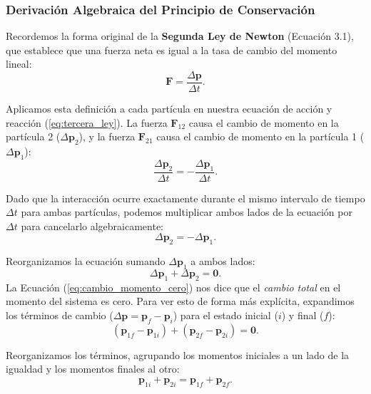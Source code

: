 \documentclass[11pt,a4paper]{book}
\begin{document}
\subsubsection{Derivación Algebraica del Principio de Conservación}

Recordemos la forma original de la \textbf{Segunda Ley de Newton} (Ecuación 3.1), que establece que una fuerza neta es igual a la tasa de cambio del momento lineal:
\begin{equation}
    \boldsymbol{F} = \frac{\Delta \boldsymbol{p}}{\Delta t}.
\end{equation}

Aplicamos esta definición a cada partícula en nuestra ecuación de acción y reacción (\ref{eq:tercera_ley}). La fuerza $\boldsymbol{F}_{12}$ causa el cambio de momento en la partícula 2 ($\Delta \boldsymbol{p}_2$), y la fuerza $\boldsymbol{F}_{21}$ causa el cambio de momento en la partícula 1 ($\Delta \boldsymbol{p}_1$):
\begin{equation}
    \frac{\Delta \boldsymbol{p}_2}{\Delta t} = - \frac{\Delta \boldsymbol{p}_1}{\Delta t}.
\end{equation}

Dado que la interacción ocurre exactamente durante el mismo intervalo de tiempo $\Delta t$ para ambas partículas, podemos multiplicar ambos lados de la ecuación por $\Delta t$ para cancelarlo algebraicamente:
\begin{equation}
    \Delta \boldsymbol{p}_2 = - \Delta \boldsymbol{p}_1.
\end{equation}

Reorganizamos la ecuación sumando $\Delta \boldsymbol{p}_1$ a ambos lados:
\begin{equation}
    \Delta \boldsymbol{p}_1 + \Delta \boldsymbol{p}_2 = \boldsymbol{0}.
    \label{eq:cambio_momento_cero}
\end{equation}
La Ecuación (\ref{eq:cambio_momento_cero}) nos dice que el \textit{cambio total} en el momento del sistema es cero. Para ver esto de forma más explícita, expandimos los términos de cambio ($\Delta \boldsymbol{p} = \boldsymbol{p}_f - \boldsymbol{p}_i$) para el estado inicial ($i$) y final ($f$):
\begin{equation}
    (\boldsymbol{p}_{1f} - \boldsymbol{p}_{1i}) + (\boldsymbol{p}_{2f} - \boldsymbol{p}_{2i}) = \boldsymbol{0}.
\end{equation}


Reorganizamos los términos, agrupando los momentos iniciales a un lado de la igualdad y los momentos finales al otro:
\begin{equation}
    \boldsymbol{p}_{1i} + \boldsymbol{p}_{2i} = \boldsymbol{p}_{1f} + \boldsymbol{p}_{2f}.
    \label{eq:conservacion_momento}
\end{equation}
\end{document}
